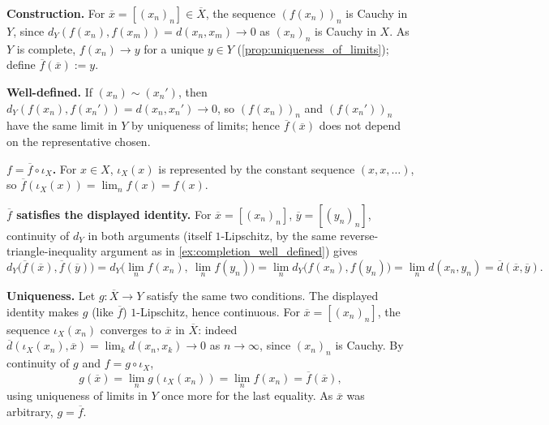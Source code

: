 \begin{exercisesolution}
\label{sol:completion_universal_property}
\textbf{Construction.} For $\overline x = [(x_n)_n] \in \overline X$, the sequence $(f(x_n))_n$
is Cauchy in $Y$, since $d_Y(f(x_n),f(x_m)) = d(x_n,x_m) \to 0$ as $(x_n)_n$ is Cauchy in $X$.
As $Y$ is complete, $f(x_n) \to y$ for a unique $y \in Y$
(\cref{prop:uniqueness_of_limits}); define $\overline f(\overline x) := y$.

\textbf{Well-defined.} If $(x_n)\sim(x_n')$, then $d_Y(f(x_n),f(x_n')) = d(x_n,x_n') \to 0$, so
$(f(x_n))_n$ and $(f(x_n'))_n$ have the same limit in $Y$ by uniqueness of limits; hence
$\overline f(\overline x)$ does not depend on the representative chosen.

\textbf{$f = \overline f \circ \iota_X$.} For $x\in X$, $\iota_X(x)$ is represented by the
constant sequence $(x,x,\dots)$, so $\overline f(\iota_X(x)) = \lim_n f(x) = f(x)$.

\textbf{$\overline f$ satisfies the displayed identity.} For $\overline x = [(x_n)_n]$,
$\overline y = [(y_n)_n]$, continuity of $d_Y$ in both arguments (itself $1$-Lipschitz, by the
same reverse-triangle-inequality argument as in \cref{ex:completion_well_defined}) gives
\[d_Y\big(\overline f(\overline x),\overline f(\overline y)\big)
  = d_Y\Big(\lim_n f(x_n),\ \lim_n f(y_n)\Big)
  = \lim_n d_Y\big(f(x_n),f(y_n)\big)
  = \lim_n d(x_n,y_n) = \overline d(\overline x,\overline y).\]

\textbf{Uniqueness.} Let $g : \overline X \to Y$ satisfy the same two conditions. The displayed
identity makes $g$ (like $\overline f$) $1$-Lipschitz, hence continuous. For
$\overline x = [(x_n)_n]$, the sequence $\iota_X(x_n)$ converges to $\overline x$ in
$\overline X$: indeed $\overline d(\iota_X(x_n),\overline x) = \lim_k d(x_n,x_k) \to 0$ as
$n\to\infty$, since $(x_n)_n$ is Cauchy. By continuity of $g$ and $f = g\circ\iota_X$,
\[g(\overline x) = \lim_n g(\iota_X(x_n)) = \lim_n f(x_n) = \overline f(\overline x),\]
using uniqueness of limits in $Y$ once more for the last equality. As $\overline x$ was
arbitrary, $g = \overline f$.
\end{exercisesolution}

